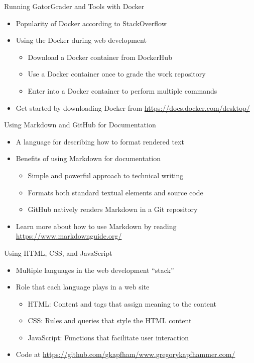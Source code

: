 \documentclass[14pt,aspectratio=169]{beamer}
\begin{document}
%
\begin{frame}{Running GatorGrader and Tools with Docker}
%
  \begin{itemize}
    \item Popularity of Docker according to StackOverflow
    \item Using the Docker during web development
      \begin{itemize}
        \item Download a Docker container from DockerHub
        \item Use a Docker container once to grade the work repository
        \item Enter into a Docker container to perform multiple commands
      \end{itemize}
    \item Get started by downloading Docker from \url{https://docs.docker.com/desktop/}
  \end{itemize}
%
\end{frame}

%
\begin{frame}{Using Markdown and GitHub for Documentation}
%
  \begin{itemize}
    \item A language for describing how to format rendered text
    \item Benefits of using Markdown for documentation
      \begin{itemize}
        \item Simple and powerful approach to technical writing
        \item Formats both standard textual elements and source code
        \item GitHub natively renders Markdown in a Git repository
      \end{itemize}
    \item Learn more about how to use Markdown by reading \url{https://www.markdownguide.org/}
  \end{itemize}
%
\end{frame}

%
\begin{frame}{Using HTML, CSS, and JavaScript}
%
  \begin{itemize}
    \item Multiple languages in the web development ``stack''
    \item Role that each language plays in a web site
      \begin{itemize}
        \item HTML: Content and tags that assign meaning to the content
        \item CSS: Rules and queries that style the HTML content
        \item JavaScript: Functions that facilitate user interaction
      \end{itemize}
    \item Code at \url{https://github.com/gkapfham/www.gregorykapfhammer.com/}
  \end{itemize}
%
\end{frame}
\end{document}
